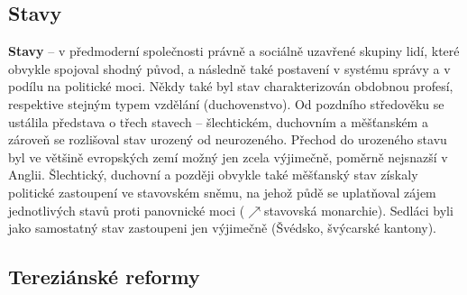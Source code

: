 \documentclass{article}
\begin{document}
  \subsection*{Stavy~\cite{Hroch:}}
  \label{sec:stavy}

  {\bf Stavy} -- v předmoderní společnosti právně a sociálně uzavřené skupiny lidí, které obvykle spojoval shodný původ, a následně také postavení v systému správy a v podílu na politické moci. Někdy také byl stav charakterizován obdobnou profesí, respektive stejným typem vzdělání (duchovenstvo). Od pozdního středověku se ustálila představa o třech stavech -- šlechtickém, duchovním a měšťanském a zároveň se rozlišoval stav urozený od neurozeného. Přechod do urozeného stavu byl ve většině evropských zemí možný jen zcela výjimečně, poměrně nejsnazší v Anglii. Šlechtický, duchovní a později obvykle také měšťanský stav získaly politické zastoupení ve stavovském sněmu, na jehož půdě se uplatňoval zájem jednotlivých stavů proti panovnické moci ($\nearrow$stavovská monarchie). Sedláci byli jako samostatný stav zastoupeni jen výjimečně (Švédsko, švýcarské kantony).

  \subsection*{Tereziánské reformy~\cite{Hroch:}}
  \label{sec:terezianskeReformy}
\end{document}
